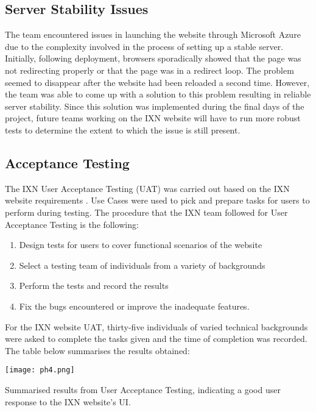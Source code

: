 \documentclass[fontsize=11pt]{extarticle}
\numberwithin{figure}{section} %
\numberwithin{table}{section}%
\providecommand{\tightlist}{%
  \setlength{\itemsep}{0pt}\setlength{\parskip}{0pt}}
\begin{document}
\hypertarget{server-stability-issues}{%
\subsection{Server Stability Issues}\label{server-stability-issues}}

The team encountered issues in launching the website through Microsoft
Azure due to the complexity involved in the process of setting up a
stable server. Initially, following deployment, browsers sporadically
showed that the page was not redirecting properly or that the page was
in a redirect loop. The problem seemed to disappear after the website
had been reloaded a second time. However, the team was able to come up
with a solution to this problem resulting in reliable server stability.
Since this solution was implemented during the final days of the
project, future teams working on the IXN website will have to run more
robust tests to determine the extent to which the issue is still
present.

\hypertarget{acceptance-testing}{%
\subsection{Acceptance Testing}\label{acceptance-testing}}

The IXN User Acceptance Testing (UAT) was carried out based on the IXN
website requirements\cite{g7} . Use Cases were used to pick and prepare
tasks for users to perform during testing. The procedure that the IXN
team followed for User Acceptance Testing is the following:

\begin{enumerate}

\tightlist
\item
  Design tests for users to cover functional scenarios of the website
\item
  Select a testing team of individuals from a variety of backgrounds
\item
  Perform the tests and record the results
\item
  Fix the bugs encountered or improve the inadequate features.
\end{enumerate}

For the IXN website UAT, thirty-five individuals of varied technical
backgrounds were asked to complete the tasks given and the time of
completion was recorded. The table below summarises the results
obtained:

\begin{table}[H]
      \centering
      \texttt{[image: ph4.png]}
      \caption{Summarised results from User Acceptance Testing, indicating a good user response to the IXN website's UI. }
 \end{table}
\end{document}
